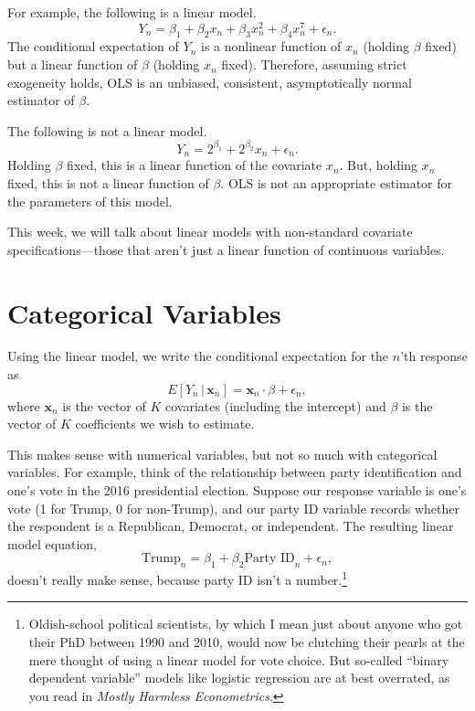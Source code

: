 \documentclass[
  12pt,
  oneside,openany]{book}
\begin{document}
For example, the following is a linear model.
\[
Y_n = \beta_1 + \beta_2 x_n + \beta_3 x_n^2 + \beta_4 x_n^7 + \epsilon_n.
\]
The conditional expectation of \(Y_n\) is a nonlinear function of \(x_n\) (holding \(\beta\) fixed) but a linear function of \(\beta\) (holding \(x_n\) fixed). Therefore, assuming strict exogeneity holds, OLS is an unbiased, consistent, asymptotically normal estimator of \(\beta\).

The following is not a linear model.
\[
Y_n = 2^{\beta_1} + 2^{\beta_2} x_n + \epsilon_n.
\]
Holding \(\beta\) fixed, this is a linear function of the covariate \(x_n\). But, holding \(x_n\) fixed, this is not a linear function of \(\beta\). OLS is not an appropriate estimator for the parameters of this model.

This week, we will talk about linear models with non-standard covariate specifications---those that aren't just a linear function of continuous variables.

\hypertarget{categorical-variables}{%
\section{Categorical Variables}\label{categorical-variables}}

Using the linear model, we write the conditional expectation for the \(n\)'th response as
\[
E[Y_n \,|\, \mathbf{x}_n] = \mathbf{x}_n \cdot \beta + \epsilon_n,
\]
where \(\mathbf{x}_n\) is the vector of \(K\) covariates (including the intercept) and \(\beta\) is the vector of \(K\) coefficients we wish to estimate.

This makes sense with numerical variables, but not so much with categorical variables. For example, think of the relationship between party identification and one's vote in the 2016 presidential election. Suppose our response variable is one's vote (1 for Trump, 0 for non-Trump), and our party ID variable records whether the respondent is a Republican, Democrat, or independent. The resulting linear model equation,
\[
\text{Trump}_n = \beta_1 + \beta_2 \text{Party ID}_n + \epsilon_n,
\]
doesn't really make sense, because party ID isn't a number.\footnote{Oldish-school political scientists, by which I mean just about anyone who got their PhD between 1990 and 2010, would now be clutching their pearls at the mere thought of using a linear model for vote choice. But so-called ``binary dependent variable'' models like logistic regression are at best overrated, as you read in \emph{Mostly Harmless Econometrics}.}
\end{document}
